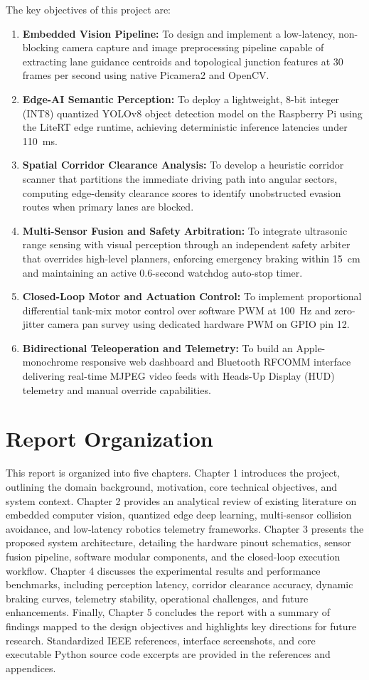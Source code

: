 The key objectives of this project are:
\begin{enumerate}
    \item \textbf{Embedded Vision Pipeline:} To design and implement a low-latency, non-blocking camera capture and image preprocessing pipeline capable of extracting lane guidance centroids and topological junction features at 30 frames per second using native Picamera2 and OpenCV.
    \item \textbf{Edge-AI Semantic Perception:} To deploy a lightweight, 8-bit integer (INT8) quantized YOLOv8 object detection model on the Raspberry Pi using the LiteRT edge runtime, achieving deterministic inference latencies under 110~ms.
    \item \textbf{Spatial Corridor Clearance Analysis:} To develop a heuristic corridor scanner that partitions the immediate driving path into angular sectors, computing edge-density clearance scores to identify unobstructed evasion routes when primary lanes are blocked.
    \item \textbf{Multi-Sensor Fusion and Safety Arbitration:} To integrate ultrasonic range sensing with visual perception through an independent safety arbiter that overrides high-level planners, enforcing emergency braking within 15~cm and maintaining an active 0.6-second watchdog auto-stop timer.
    \item \textbf{Closed-Loop Motor and Actuation Control:} To implement proportional differential tank-mix motor control over software PWM at 100~Hz and zero-jitter camera pan survey using dedicated hardware PWM on GPIO pin 12.
    \item \textbf{Bidirectional Teleoperation and Telemetry:} To build an Apple-monochrome responsive web dashboard and Bluetooth RFCOMM interface delivering real-time MJPEG video feeds with Heads-Up Display (HUD) telemetry and manual override capabilities.
\end{enumerate}

\section{Report Organization}
This report is organized into five chapters. Chapter 1 introduces the project, outlining the domain background, motivation, core technical objectives, and system context. Chapter 2 provides an analytical review of existing literature on embedded computer vision, quantized edge deep learning, multi-sensor collision avoidance, and low-latency robotics telemetry frameworks. Chapter 3 presents the proposed system architecture, detailing the hardware pinout schematics, sensor fusion pipeline, software modular components, and the closed-loop execution workflow. Chapter 4 discusses the experimental results and performance benchmarks, including perception latency, corridor clearance accuracy, dynamic braking curves, telemetry stability, operational challenges, and future enhancements. Finally, Chapter 5 concludes the report with a summary of findings mapped to the design objectives and highlights key directions for future research. Standardized IEEE references, interface screenshots, and core executable Python source code excerpts are provided in the references and appendices.
